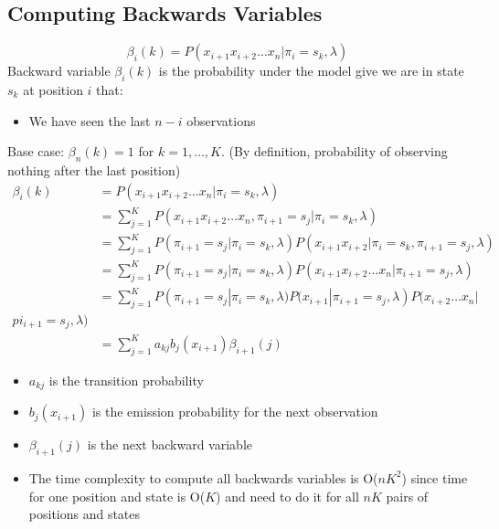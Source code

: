\documentclass[10pt]{article}
\begin{document}
\subsection*{Computing Backwards Variables}
\[\beta_i(k) = P(x_{i + 1} x_{i + 2} \dots x_n | \pi_i = s_k, \lambda)\]
Backward variable $\beta_i(k)$ is the probability under the model give we are in state $s_k$ at position $i$ that:
\begin{itemize}
	\item We have seen the last $n - i$ observations
\end{itemize}
Base case: $\beta_n (k) = 1$ for $k = 1, \dots, K$.  (By definition, probability of observing nothing after the last position)
\begin{align*}
    \beta_i(k) &= P(x_{i + 1} x_{i + 2} \dots x_n | \pi_i = s_k, \lambda)\\
    &= \sum_{j = 1}^K P(x_{i + 1} x_{i + 2} \dots x_n, \pi_{i + 1} = s_j | \pi_i = s_k, \lambda)\\
    &= \sum_{j = 1}^K P(\pi_{i + 1} = s_j | \pi_i = s_k, \lambda) P(x_{i + 1} x_{i + 2} | \pi_i = s_k, \pi_{i + 1} = s_j, \lambda)\\
    &= \sum_{j = 1}^K P(\pi_{i + 1} = s_j | \pi_i = s_k, \lambda) P(x_{i + 1} x_{i + 2} \dots x_n | \pi_{i + 1} = s_j, \lambda)\\
    &= \sum_{j = 1}^K P(\pi_{i + 1} = s_j | \pi_i = s_k, \lambda) P(x_{i + 1} | \pi_{i + 1} = s_j, \lambda) P(x_{i + 2} \dots x_n | \\pi_{i + 1} = s_j, \lambda)\\
    &= \sum_{j = 1}^K a_{kj} b_j (x_{i + 1}) \beta_{i + 1}(j)
\end{align*}
\begin{itemize}
	\item $a_{kj}$ is the transition probability
	\item $b_j(x_{i + 1})$ is the emission probability for the next observation
	\item $\beta_{i + 1}(j)$ is the next backward variable
	\item The time complexity to compute all backwards variables is O($nK^2$) since time for one position and state is O($K$) and need to do it for all $nK$ pairs of positions and states
\end{itemize}
\end{document}
